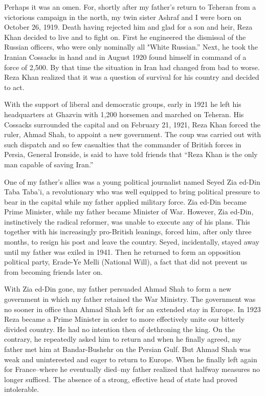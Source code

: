 Perhaps it was an omen. For, shortly after my father’s return to Teheran from a victorious campaign in the north, my twin sister Ashraf and I were born on October 26, 1919. Death having rejected him and glad for a son and heir, Reza Khan decided to live and to fight on. First he engineered the dismissal of the Russian officers, who were only nominally all "White Russian.” Next, he took the Iranian Cossacks in hand and in August 1920 found himself in command of a force of 2,500. By that time the situation in Iran had changed from bad to worse. Reza Khan realized that it was a question of survival for his country and decided to act. 

With the support of liberal and democratic groups, early in 1921 he left his headquarters at Ghazvin with 1,200 horsemen and marched on Teheran. His Cossacks surrounded the capital and on February 21, 1921, Reza Khan forced the ruler, Ahmad Shah, to appoint a new government. The coup was carried out with such dispatch and so few casualties that the commander of British forces in Persia, General Ironside, is said to have told friends that “Reza Khan is the only man capable of saving Iran.” 

One of my father’s allies was a young political journalist named Seyed Zia ed-Din Taba Taba'i, a revolutionary who was well equipped to bring political pressure to bear in the capital while my father applied military force. Zia ed-Din became Prime Minister, while my father became Minister of War. However, Zia ed-Din, instinctively the radical reformer, was unable to execute any of his plans. This together with his increasingly pro-British leanings, forced him, after only three months, to resign his post and leave the country. Seyed, incidentally, stayed away until my father was exiled in 1941. Then he returned to form an opposition political party, Erade-Ye Melli (National Will), a fact that did not prevent us from becoming friends later on. 

With Zia ed-Din gone, my father persuaded Ahmad Shah to form a new government in which my father retained the War Ministry. The government was no sooner in office than Ahmad Shah left for an extended stay in Europe. In 1923 Reza became a Prime Minister in order to more effectively unite our bitterly divided country. He had no intention then of dethroning the king. On the contrary, he repeatedly asked him to return and when he finally agreed, my father met him at Bandar-Bushehr on the Persian Gulf. But Ahmad Shah was weak and uninterested and eager to return to Europe. When he finally left again for France--where he eventually died--my father realized that halfway measures no longer sufficed. The absence of a strong, effective head of state had proved intolerable. 

